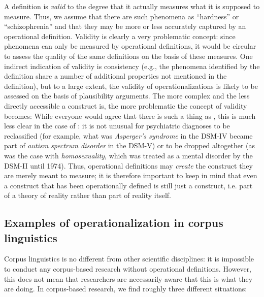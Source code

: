 A definition is \emph{valid}  to the degree that it actually measures  what it is supposed to measure. Thus, we assume that there are such phenomena as ``hardness'' or ``schizophrenia'' and that they may be more or less accurately captured by an operational  definition. Validity is clearly a very problematic concept: since phenomena can only be measured by operational definitions, it would be circular to assess the quality of the same definitions on the basis of these measures. One indirect indication of validity is consistency (e.g., the phenomena identified by the definition share a number of additional properties not mentioned in the definition), but to a large extent, the validity of operationalizations is likely to be assessed on the basis of plausibility arguments. The more complex and the less directly accessible a construct is, the more problematic the concept of validity becomes: While everyone would agree that there is such a thing as , this is much less clear in the case of : it is not unusual for psychiatric diagnoses to be reclassified (for example, what was \textit{Asperger's syndrome} in the DSM\hyp{}IV became part of \textit{autism spectrum disorder} in the DSM\hyp{}V) or to be dropped altogether (as was the case with \textit{homosexuality}, which was treated as a mental disorder by the DSM\hyp{}II until 1974). Thus, operational  definitions may \emph{create} the construct they are merely meant to measure;  it is therefore important to keep in mind that even a construct that has been operationally defined is still just a construct, i.e. part of a theory of reality rather than part of reality itself.

\subsection{Examples of operationalization in corpus linguistics}
\label{sec:operationalcorpuslinguistics}

Corpus linguistics is no different from other scientific disciplines: it is impossible to conduct any corpus\hyp{}based research without operational  definitions. However, this does not mean that researchers are necessarily aware that this is what they are doing. In corpus\hyp{}based research, we find roughly three different situations:

